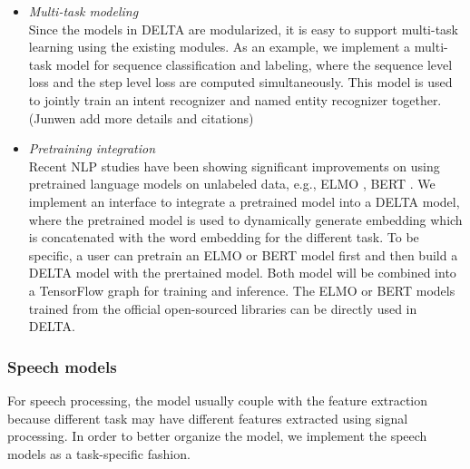 \documentclass{article}
\begin{document}
\begin{itemize}
    \item \textit{Multi-task modeling} \\
    Since the models in DELTA are modularized, it is easy to support multi-task learning using the existing modules. As an example, we implement a multi-task model for sequence classification and labeling, where the sequence level loss and the step level loss are computed simultaneously. This model is used to jointly train an intent recognizer and named entity recognizer together. (Junwen add more details and citations)

    \item \textit{Pretraining integration} \\
    Recent NLP studies have been showing significant improvements on using pretrained language models on unlabeled data, e.g., ELMO \citep{Peters:2018}, BERT \citep{devlin2019bert}. We implement an interface to integrate a pretrained model into a DELTA model, where the pretrained model is used to dynamically generate embedding which is concatenated with the word embedding for the different task. To be specific, a user can pretrain an ELMO or BERT model first and then build a DELTA model with the prertained model. Both model will be combined into a TensorFlow graph for training and inference. The ELMO or BERT models trained from the official open-sourced libraries can be directly used in DELTA.

\end{itemize}


\subsubsection{Speech models}
For speech processing, the model usually couple with the feature extraction because different task may have different features extracted using signal processing. In order to better organize the model, we implement the speech models as a task-specific fashion.
\end{document}

